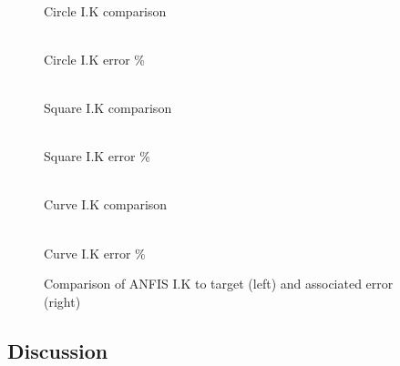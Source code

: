 \documentclass[a4paper,11pt]{article}
\begin{document}
\begin{figure}[H]

\begin{minipage}{.5\linewidth}
\centering
{}\\{Circle I.K comparison}
\end{minipage}
\begin{minipage}{.5\linewidth}
\centering
{}\\{Circle I.K error \%}

\end{minipage}\par\medskip

\begin{minipage}{.5\linewidth}
\centering
{}\\{Square I.K comparison}

\end{minipage}
\begin{minipage}{.5\linewidth}
\centering
{}\\{Square I.K error \%}

\end{minipage}\par\medskip

\begin{minipage}{.5\linewidth}
\centering
{}\\{Curve I.K comparison}

\end{minipage}
\begin{minipage}{.5\linewidth}
\centering
{}\\{Curve I.K error \%}

\end{minipage}
\caption{Comparison of ANFIS I.K to target (left) and associated error (right)}
\label{fig:ANFIS}
\end{figure}


\subsection{Discussion}
\end{document}
